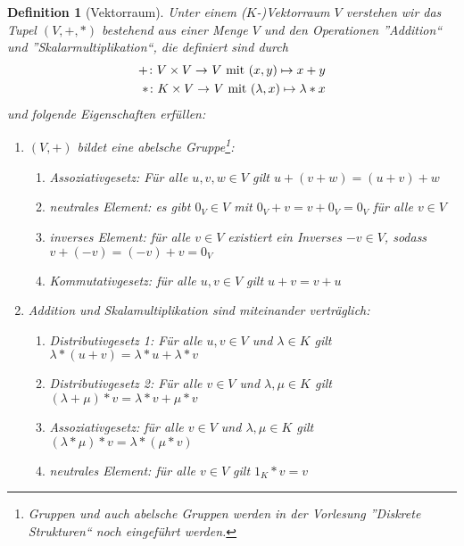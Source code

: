 \documentclass[ngerman, a4paper, 12pt]{scrartcl}
\newcounter{themcount}
\theoremstyle{plain}
\newtheorem{definition}[themcount]{Definition}
\theoremstyle{proofstyle}
\begin{document}
	\begin{definition}[Vektorraum]
		Unter einem ($K$-)Vektorraum $V$ verstehen wir das Tupel $(V,+,*)$ bestehend aus einer Menge $V$ und den Operationen ''Addition`` und ''Skalarmultiplikation``, die definiert sind durch
		\begin{equation*}
			\begin{aligned}
				\abb{+}{V \times V}{V} \mit (x,y) \mapsto x + y \\
				\abb{*}{K \times V}{V} \mit (\lambda , x) \mapsto \lambda * x
			\end{aligned}
		\end{equation*}
		und folgende Eigenschaften erfüllen:
		\begin{enumerate}[label=(V\arabic*), leftmargin=*]
			\item $(V,+)$ bildet eine abelsche Gruppe\footnote{Gruppen und auch abelsche Gruppen werden in der Vorlesung ''Diskrete Strukturen`` noch eingeführt werden.}:
			\begin{enumerate}[label=(\alph*), noitemsep]
				\item \textit{Assoziativgesetz}: Für alle $u,v,w \in V$ gilt $u + (v + w) = (u + v) + w$
				\item \textit{neutrales Element}: es gibt $0_V \in V$ mit $0_V + v = v + 0_V = 0_V$ für alle $v \in V$
				\item \textit{inverses Element}: für alle $v \in V$ existiert ein Inverses $-v \in V$, sodass $v + (-v) = (-v) + v = 0_V$
				\item \textit{Kommutativgesetz}: für alle $u,v \in V$ gilt $u + v = v + u$
			\end{enumerate}
		\item Addition und Skalamultiplikation sind miteinander verträglich: 
			\begin{enumerate}[label=(\alph*), noitemsep]
				\item \textit{Distributivgesetz 1}: Für alle $u,v \in V$ und $\lambda \in K$ gilt $\lambda * (u + v) = \lambda * u + \lambda * v$
				\item \textit{Distributivgesetz 2}: Für alle $v \in V$ und $\lambda, \mu \in K$ gilt $(\lambda + \mu) * v = \lambda * v + \mu * v$
				\item \textit{Assoziativgesetz}: für alle $v \in V$ und $\lambda, \mu \in K$ gilt $(\lambda * \mu) * v = \lambda * (\mu * v)$
				\item \textit{neutrales Element}: für alle $v \in V$ gilt $1_K * v = v$
			\end{enumerate}
		\end{enumerate}
	\end{definition}
\end{document}
